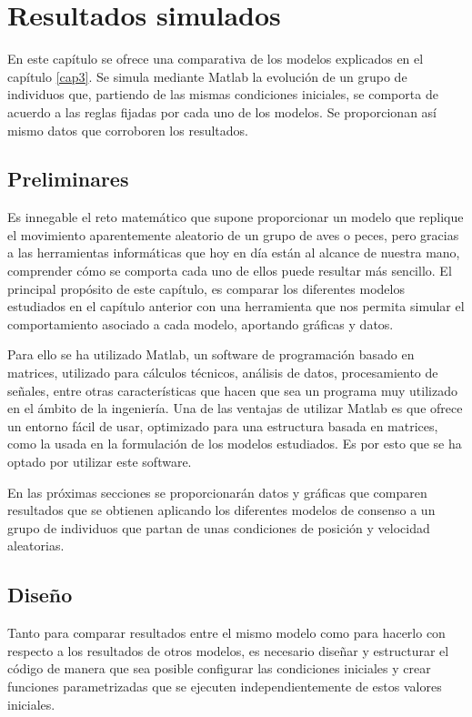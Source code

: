 \chapter{Resultados simulados} \label{cap4}


En este capítulo se ofrece una comparativa de los modelos explicados en el capítulo \ref{cap3}. Se simula mediante Matlab la evolución de un grupo de individuos que, partiendo de las mismas condiciones iniciales, se comporta de acuerdo a las reglas fijadas por cada uno de los modelos. Se proporcionan así mismo datos que corroboren los resultados.

\section{Preliminares} \label{s4_1}
Es innegable el reto matemático que supone proporcionar un modelo que replique el movimiento aparentemente aleatorio de un grupo de aves o peces, pero gracias a las herramientas informáticas que hoy en día están al alcance de nuestra mano, comprender cómo se comporta cada uno de ellos puede resultar más sencillo. El principal propósito de este capítulo, es comparar los diferentes modelos  estudiados en el capítulo anterior con una herramienta que nos permita simular el comportamiento asociado a cada modelo, aportando gráficas y datos. 

Para ello se ha utilizado Matlab, un software de programación basado en matrices, utilizado para cálculos técnicos, análisis de datos, procesamiento de señales, entre otras características que hacen que sea un programa muy utilizado en el ámbito de la ingeniería. Una de las ventajas de utilizar Matlab es que ofrece un entorno fácil de usar, optimizado para una estructura basada en matrices, como la usada en la formulación de los modelos estudiados. Es por esto que se ha optado por utilizar este software.

En las próximas secciones se proporcionarán datos y gráficas que comparen resultados que se obtienen aplicando los diferentes modelos de consenso a un grupo de individuos que partan de unas condiciones de posición y velocidad aleatorias. 

\section{Diseño} \label{s4_2}
Tanto para comparar resultados entre el mismo modelo como para hacerlo con respecto a los resultados de otros modelos, es necesario diseñar y estructurar el código de manera que sea posible configurar las condiciones iniciales y crear funciones parametrizadas que se ejecuten independientemente de estos valores iniciales.

